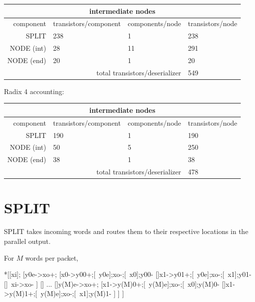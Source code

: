 \documentclass{article}
\begin{document}
\begin{center}
    \begin{tabular}{|r|l|l|l|}
    \hline \multicolumn{4}{|c|}{intermediate nodes} \\ \hline
    component & transistors/component & components/node & transistors/node \\ \hline
    SPLIT & 238 & 1 & 238 \\ \hline
    NODE (int)  & 28 & 11 & 291 \\ \hline
    NODE (end)  & 20 & 1 & 20 \\ \hline
    \hline \multicolumn{3}{|r|}{total transistors/deserializer} & 549 \\ \hline
    \end{tabular}
\end{center}

\noindent
Radix 4 accounting:

\begin{center}
    \begin{tabular}{|r|l|l|l|}
    \hline \multicolumn{4}{|c|}{intermediate nodes} \\ \hline
    component & transistors/component & components/node & transistors/node \\ \hline
    SPLIT & 190 & 1 & 190 \\ \hline
    NODE (int)  & 50 & 5 & 250 \\ \hline
    NODE (end)  & 38 & 1 & 38 \\ \hline
    \hline \multicolumn{3}{|r|}{total transistors/deserializer} & 478 \\ \hline
    \end{tabular}
\end{center}

\section{SPLIT \label{sec:DESERIAL_CHAIN_SPLIT}}

SPLIT takes incoming words and routes them to their respective locations
in the parallel output.

\noindent
For $M$ words per packet,

\begin{hse}
*[[xi];
  [y0e->xo+;
    [x0->y00+;[~y0e];xo-;[~x0];y00-
    []x1->y01+;[~y0e];xo-;[~x1];y01-
    []~xi->xo-
    ]
  [] ...
  []y(M)e->xo+;
    [x1->y(M)0+;[~y(M)e];xo-;[~x0];y(M)0-
    []x1->y(M)1+;[~y(M)e];xo-;[~x1];y(M)1-
    ]
  ]
 ]
\end{hse}
\end{document}
